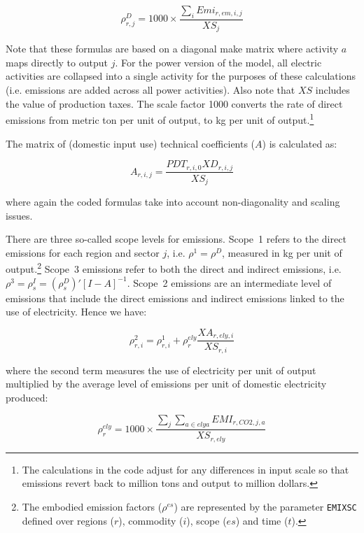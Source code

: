 \documentclass[11pt,letterpaper]{report}
\begin{document}
\[
\rho^D_{r,j} = 1000 \times \frac{\sum_i \mathit{Emi}_{r,\mathit{em},i,\mathit{j}}} {\mathit{XS}_j}
\]

\noindent Note that these formulas are based on a diagonal make matrix where activity $a$ maps directly to output $j$.
For the power version of the model, all electric activities are collapsed into a single activity for the
purposes of these calculations (i.e. emissions are added across all power activities). Also note
that $\mathit{XS}$ includes the value of production taxes. The scale factor 1000 converts the
rate of direct emissions from metric ton per unit of output, to kg per unit of output.\footnote{The
calculations in the code adjust for any differences in input scale so that emissions revert back
to million tons and output to million dollars.}

The matrix of (domestic input use) technical coefficients ($A$) is calculated as:

\[
A_{r,i,j} = \frac{\mathit{PDT}_{r,i,0} \mathit{XD}_{r,i,\mathit{j}} }{\mathit{XS}_j}
\]

\noindent where again the coded formulas take into account non-diagonality and scaling issues.

There are three so-called scope levels for emissions.
Scope~1 refers to the direct emissions for each
region and sector $j$, i.e. $\rho^1 = \rho^D$, measured
in kg per unit of output.\footnote{The embodied emission factors
($\rho^{\mathit{es}}$) are represented by the
parameter \texttt{EMIXSC} defined over
regions ($r$), commodity ($i$), scope ($\mathit{es}$) and
time ($t$).}
Scope~3 emissions refer to both the direct and
indirect emissions, i.e. $\rho^3 = \rho^I_s = \left(\rho^D_s\right)'\left[I-A\right]^{-1}$.
Scope~2 emissions are an intermediate level of
emissions that include the direct emissions and
indirect emissions linked to the use of electricity.
Hence we have:

\[
\rho^2_{r,i} = \rho^1_{r,i}
+ \rho^{\mathit{ely}}_{r} \frac{\mathit{XA}_{r,\mathit{ely},i}}{\mathit{XS}_{r,i}}
\]

\noindent where the second term measures the use of
electricity per unit of output multiplied by the
average level of emissions per unit of domestic electricity
produced:

\[
\rho^{\mathit{ely}}_{r}
= 1000 \times \frac{\sum_j{\sum_{a \in {\mathit{elya}}}{\mathit{EMI}_{r,\mathit{CO2},j,a}}}}
{\mathit{XS}_{\mathit{r,ely}}}
\]

\end{document}
